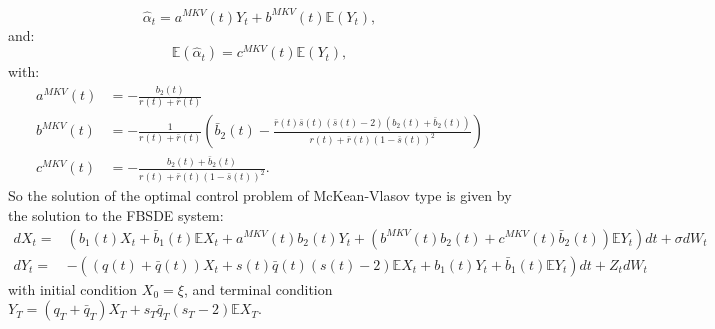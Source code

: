 \documentclass[11pt]{article}
\begin{document}
\begin{equation*}
    \hat{\alpha}_t=a^{MKV}(t)Y_t+b^{MKV}(t)\mathbb{E}(Y_t),
\end{equation*}
and:
\begin{equation*}
    \mathbb{E}(\hat{\alpha}_t)=c^{MKV}(t)\mathbb{E}(Y_t),
\end{equation*}
with:
\begin{equation*}
\begin{split}
    a^{MKV}(t)&=-\frac{b_2(t)}{r(t)+\bar{r}(t)} \\
    b^{MKV}(t)&=-\frac{1}{r(t)+\bar{r}(t)}\left(\bar{b}_2(t)-\frac{\bar{r}(t)\bar{s}(t)(\bar{s}(t)-2)(b_2(t)+\bar{b}_2(t))}{r(t)+\bar{r}(t)(1-\bar{s}(t))^2} \right) \\
    c^{MKV}(t)&=-\frac{b_2(t)+\bar{b}_2(t)}{r(t)+\bar{r}(t)(1-\bar{s}(t))^2}.
\end{split}
\end{equation*}
So the solution of the optimal control problem of McKean-Vlasov type is given by the solution to the FBSDE system:
\begin{equation}
\begin{split}
        dX_t=&\left(b_1(t)X_t+\bar{b}_1(t) \mathbb{E}X_t+a^{MKV}(t)b_2(t)Y_t+(b^{MKV}(t)b_2(t)+c^{MKV}(t)\bar{b}_2(t))\mathbb{E}Y_t\right)dt+\sigma dW_t \\
        dY_t=&-\left((q(t)+\bar{q}(t))X_t+s(t)\bar{q}(t)(s(t)-2)\mathbb{E}X_t+b_1(t)Y_t+\bar{b}_1(t)\mathbb{E}Y_t\right)dt +Z_t dW_t
\end{split}
\label{eq:FBSDE_EMKV}
\end{equation}
with initial condition $X_0=\xi$, and terminal condition $Y_T=(q_T+\bar{q}_T)X_T+s_T\bar{q}_T(s_T-2)\mathbb{E}X_T$.
\end{document}
